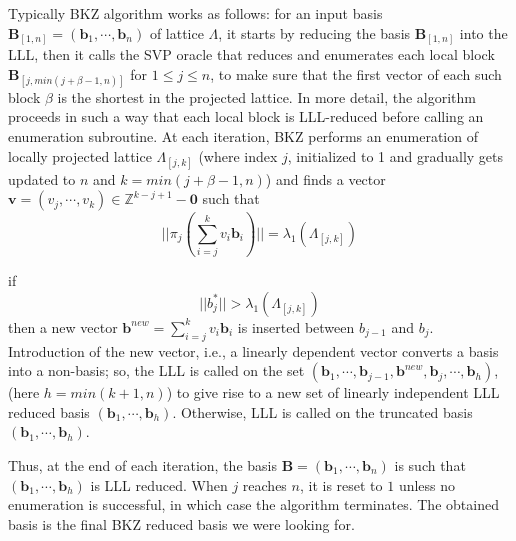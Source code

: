 Typically BKZ algorithm works as follows: for an input basis $\pmb{B}_{[1,n]} = (\pmb{b}_1, \cdots, \pmb{b}_n)$ of lattice $\Lambda$, it starts by reducing the basis $\pmb{B}_{[1,n]}$ into the LLL, then it calls the SVP oracle that reduces and enumerates each local block $\pmb{B}_{[j, min(j+\beta-1,n)]}$ for $1 \leq j \leq n$, to make sure that the first vector of each such block $\beta$ is the shortest in the projected lattice.
In more detail, the algorithm proceeds in such a way that each local block is LLL-reduced before calling an enumeration subroutine.
At each iteration, BKZ performs an enumeration of locally projected lattice $\Lambda_{[j,k]}$ (where index $j$, initialized to 1 and gradually gets updated to $n$ and $k = min(j + \beta - 1, n)$) and finds a vector $\pmb{v} = (v_j, \cdots, v_k) \in \mathbb{Z}^{k-j+1}-\pmb{0}$ such that
\begin{equation*}
    ||\pi_j(\sum_{i=j}^k v_i\pmb{b}_i)|| = \lambda_1(\Lambda_{[j,k]})
\end{equation*}

if
\begin{equation*}
    ||b^*_j|| > \lambda_1(\Lambda_{[j,k]})
\end{equation*} then a new vector $\pmb{b}^{new} = \sum_{i=j}^k v_i\pmb{b}_i$ is inserted between $b_{j-1}$ and $b_j$.
Introduction of the new vector, i.e., a linearly dependent vector converts a basis into a non-basis; so, the LLL is called on the set $(\pmb{b}_1, \cdots, \pmb{b}_{j-1}, \pmb{b}^{new}, \pmb{b}_j, \cdots, \pmb{b}_h)$,(here $h = min(k + 1, n)$) to give rise to a new set of linearly independent LLL reduced basis $(\pmb{b}_1, \cdots, \pmb{b}_h)$.
Otherwise, LLL is called on the truncated basis $(\pmb{b}_1, \cdots , \pmb{b}_h)$.














Thus, at the end of each iteration, the basis $\pmb{B} = (\pmb{b}_1, \cdots, \pmb{b}_n)$ is such that $(\pmb{b}_1, \cdots, \pmb{b}_h)$ is LLL reduced.
When $j$ reaches $n$, it is reset to $1$ unless no enumeration is successful, in which case the algorithm terminates. The obtained basis is the final BKZ reduced basis we were looking for.










